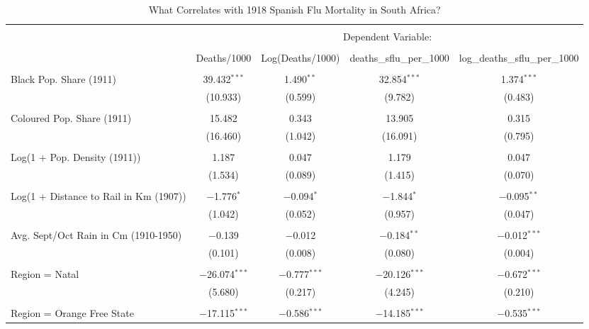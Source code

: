 
\begin{table}[!htbp] \centering 
  \caption{What Correlates with 1918 Spanish Flu Mortality in South Africa?} 
  \label{} 
\begin{tabular}{@{\extracolsep{5pt}}lcccc} 
\\[-1.8ex]\hline 
\hline \\[-1.8ex] 
 & \multicolumn{4}{c}{Dependent Variable:} \\ 
\cline{2-5} 
\\[-1.8ex] & Deaths/1000 & Log(Deaths/1000) & deaths\_sflu\_per\_1000 & log\_deaths\_sflu\_per\_1000 \\ 
\hline \\[-1.8ex] 
 Black Pop. Share  (1911) & 39.432$^{***}$ & 1.490$^{**}$ & 32.854$^{***}$ & 1.374$^{***}$ \\ 
  & (10.933) & (0.599) & (9.782) & (0.483) \\ 
  & & & & \\ 
 Coloured Pop.  Share  (1911) & 15.482 & 0.343 & 13.905 & 0.315 \\ 
  & (16.460) & (1.042) & (16.091) & (0.795) \\ 
  & & & & \\ 
 Log(1 + Pop. Density (1911)) & 1.187 & 0.047 & 1.179 & 0.047 \\ 
  & (1.534) & (0.089) & (1.415) & (0.070) \\ 
  & & & & \\ 
 Log(1 + Distance to Rail in Km (1907)) & $-$1.776$^{*}$ & $-$0.094$^{*}$ & $-$1.844$^{*}$ & $-$0.095$^{**}$ \\ 
  & (1.042) & (0.052) & (0.957) & (0.047) \\ 
  & & & & \\ 
 Avg. Sept/Oct Rain in Cm (1910-1950) & $-$0.139 & $-$0.012 & $-$0.184$^{**}$ & $-$0.012$^{***}$ \\ 
  & (0.101) & (0.008) & (0.080) & (0.004) \\ 
  & & & & \\ 
 Region = Natal & $-$26.074$^{***}$ & $-$0.777$^{***}$ & $-$20.126$^{***}$ & $-$0.672$^{***}$ \\ 
  & (5.680) & (0.217) & (4.245) & (0.210) \\ 
  & & & & \\ 
 Region = Orange Free State & $-$17.115$^{***}$ & $-$0.586$^{***}$ & $-$14.185$^{***}$ & $-$0.535$^{***}$ \\ 

\end{tabular}
\end{table}
